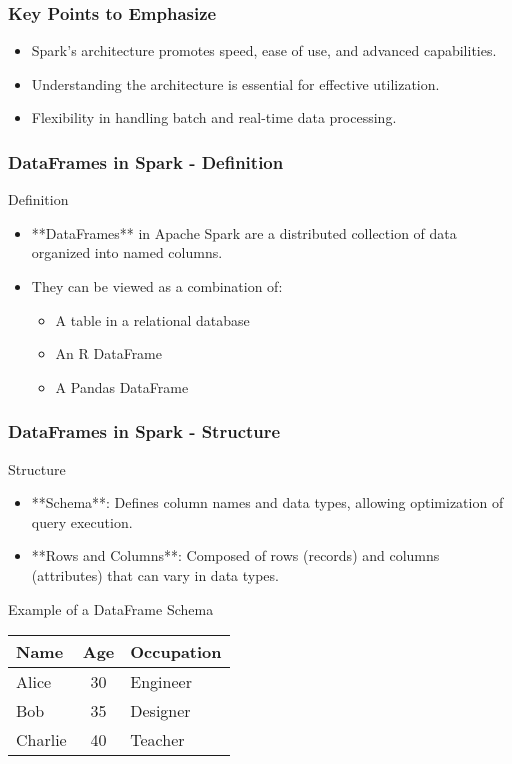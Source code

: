 \documentclass[aspectratio=169]{beamer}
\begin{document}
\begin{frame}
  \frametitle{Key Points to Emphasize}
  \begin{itemize}
    \item Spark's architecture promotes speed, ease of use, and advanced capabilities.
    \item Understanding the architecture is essential for effective utilization.
    \item Flexibility in handling batch and real-time data processing.
  \end{itemize}
\end{frame}

\begin{frame}[fragile]
    \frametitle{DataFrames in Spark - Definition}
    \begin{block}{Definition}
        \begin{itemize}
            \item **DataFrames** in Apache Spark are a distributed collection of data organized into named columns.
            \item They can be viewed as a combination of:
            \begin{itemize}
                \item A table in a relational database
                \item An R DataFrame
                \item A Pandas DataFrame
            \end{itemize}
        \end{itemize}
    \end{block}
\end{frame}

\begin{frame}[fragile]
    \frametitle{DataFrames in Spark - Structure}
    \begin{block}{Structure}
        \begin{itemize}
            \item **Schema**: Defines column names and data types, allowing optimization of query execution.
            \item **Rows and Columns**: Composed of rows (records) and columns (attributes) that can vary in data types.
        \end{itemize}
    \end{block}
    
    \begin{block}{Example of a DataFrame Schema}
        \begin{tabular}{|l|c|l|}
            \hline
            Name    & Age & Occupation \\
            \hline
            Alice   & 30  & Engineer    \\
            Bob     & 35  & Designer    \\
            Charlie & 40  & Teacher     \\
            \hline
        \end{tabular}
    \end{block}
\end{frame}
\end{document}
